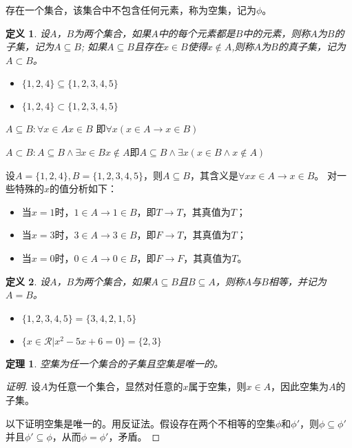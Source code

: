 \documentclass{book}[oneside]
\newtheorem{Def}{定义}[chapter]
\newtheorem{Thm}{定理}[chapter]
\begin{document}
\begin{CJK*}{UTF8}{gbsn}
存在一个集合，该集合中不包含任何元素，称为空集，记为$\phi$。

  
\begin{Def}
设$A$，$B$为两个集合，如果$A$中的每个元素都是$B$中的元素，则称$A$为$B$的子集，记为$A \subseteq B$; 如果$A \subseteq B$且存在$x\in B$使得$x \notin A$,则称$A$为$B$的真子集，记为$A\subset B$。    
\end{Def}
\begin{itemize}
  \item   $\{1,2,4\} \subseteq \{1,2,3,4,5\}$
\item $\{1,2,4\} \subset \{1,2,3,4,5\}$
\end{itemize}

  $A\subseteq B: \forall x \in A x \in B$ 即$\forall x (x \in A \to x \in B)$
  
  $A\subset B: A \subseteq B \land \exists x\in B x \notin A$即$A \subseteq B \land \exists x (x\in B \land x \notin A)$

  设$A=\{1,2,4\},B=\{1,2,3,4,5\}$，则$A\subseteq B$，其含义是$\forall x x \in A \to x \in B$。
对一些特殊的$x$的值分析如下：
    \begin{itemize}
    \item 当$x = 1$时，$1 \in A \to 1 \in B$，即$T \to T$，其真值为$T$；
    \item 当$x = 3$时，$3 \in A \to 3 \in B$，即$F \to T$，其真值为$T$；
    \item 当$x = 0$时，$0 \in A \to 0 \in B$，即$F \to F$，其真值为$T$。
    \end{itemize}

  
    \begin{Def}
    设$A$，$B$为两个集合，如果$A \subseteq B$且$B \subseteq A$，则称$A$与$B$相等，并记为$A=B$。
  \end{Def}
    \begin{itemize}
  \item   $\{1,2,3,4,5\} = \{3,4,2,1,5\}$
\item $\{x \in \mathcal{R} | x^2 -5x + 6 = 0\} = \{2,3\}$
  \end{itemize}
  \begin{Thm}
   空集为任一个集合的子集且空集是唯一的。 
  \end{Thm}
  \begin{proof}[证明]
    设$A$为任意一个集合，显然对任意的$x$属于空集，则$x\in A$，因此空集为$A$的子集。

以下证明空集是唯一的。用反证法。假设存在两个不相等的空集$\phi$和$\phi'$，则$\phi \subseteq \phi'$并且$\phi' \subseteq \phi$，从而$\phi = \phi'$，矛盾。  
    

\end{proof}
\end{CJK*}
\end{document}
